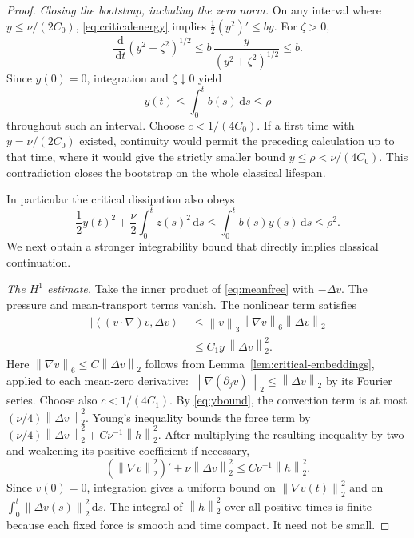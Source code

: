 \documentclass[11pt,a4paper]{article}
\theoremstyle{definition}\newtheorem{definition}[theorem]{Definition}
\theoremstyle{remark}\newtheorem{remark}[theorem]{Remark}
\newcommand{\dd}{\,\mathrm d}\newcommand{\eps}{\varepsilon}
\newcommand{\norm}[1]{\left\lVert#1\right\rVert}
\newcommand{\ip}[2]{\left\langle#1,#2\right\rangle}
\begin{document}
\begin{proof}
\emph{Closing the bootstrap, including the zero norm.}
On any interval where $y\le\nu/(2C_0)$, \eqref{eq:criticalenergy} implies
$\tfrac12(y^2)'\le by$. For $\zeta>0$,
\[
 \frac{\dd}{\dd t}(y^2+\zeta^2)^{1/2}
 \le b\,\frac{y}{(y^2+\zeta^2)^{1/2}}\le b.
\]
Since $y(0)=0$, integration and $\zeta\downarrow0$ yield
\begin{equation}\label{eq:ybound}
 y(t)\le\int_0^t b(s)\dd s\le\rho
\end{equation}
throughout such an interval. Choose $c<1/(4C_0)$.
If a first time with $y=\nu/(2C_0)$ existed, continuity would permit the preceding calculation up to that time, where it would give the strictly smaller bound $y\le\rho<\nu/(4C_0)$. This contradiction closes the bootstrap on the whole classical lifespan.

In particular the critical dissipation also obeys
\[
 \frac12y(t)^2+\frac{\nu}{2}\int_0^t z(s)^2\dd s
 \le\int_0^t b(s)y(s)\dd s\le\rho^2.
\]
We next obtain a stronger integrability bound that directly implies classical continuation.

\emph{The $H^1$ estimate.}
Take the inner product of \eqref{eq:meanfree} with $-\Delta v$.
The pressure and mean-transport terms vanish. The nonlinear term satisfies
\begin{align*}
 |\ip{(v\cdot\nabla)v}{\Delta v}|
 &\le\norm{v}_3\norm{\nabla v}_6\norm{\Delta v}_2\\
 &\le C_1y\,\norm{\Delta v}_2^2.
\end{align*}
Here $\norm{\nabla v}_6\le C\norm{\Delta v}_2$ follows from
Lemma~\ref{lem:critical-embeddings}, applied to each mean-zero derivative:
$\norm{\nabla(\partial_jv)}_2\le\norm{\Delta v}_2$ by its Fourier series. Choose also $c<1/(4C_1)$.
By \eqref{eq:ybound}, the convection term is at most
$(\nu/4)\norm{\Delta v}_2^2$. Young's inequality bounds the force term by
$(\nu/4)\norm{\Delta v}_2^2+C\nu^{-1}\norm{h}_2^2$.
After multiplying the resulting inequality by two and weakening its positive coefficient if necessary,
\begin{equation}\label{eq:H1energy}
 (\norm{\nabla v}_2^2)'
 +\nu\norm{\Delta v}_2^2\le C\nu^{-1}\norm{h}_2^2.
\end{equation}
Since $v(0)=0$, integration gives a uniform bound on
$\norm{\nabla v(t)}_2^2$ and on $\int_0^t\norm{\Delta v(s)}_2^2\dd s$.
The integral of $\norm{h}_2^2$ over all positive times is finite because each fixed force is smooth and time compact. It need not be small.


\end{proof}
\end{document}
